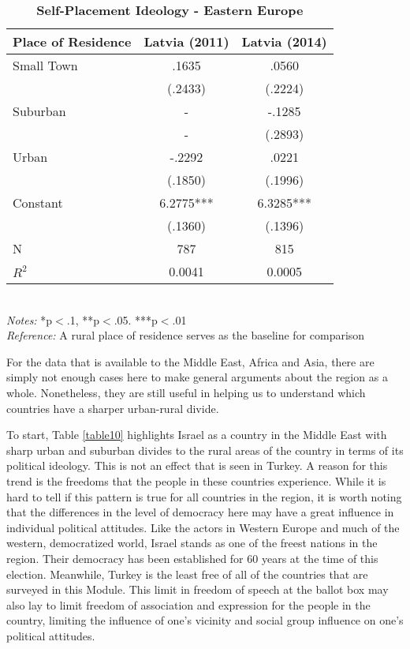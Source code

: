 \documentclass[12pt, titlepage]{article}
\newcommand\e{\emph}
\newcommand\tb{\textbf}
\begin{document}
\begin{singlespace}
	\begin{table}[H]
		\centering
		\caption{\tb{Self-Placement Ideology - Eastern Europe}}
		\begin{tabulary}{\linewidth}{l c c}
			\\
			\hline
			\tb{Place of Residence} & \tb{Latvia (2011)} &\tb{Latvia (2014)} \\
			\hline
			Small Town &.1635 &.0560 \\
			&(.2433) & (.2224) \\
			Suburban&- & -.1285 \\
			& - & (.2893) \\
			Urban&-.2292&.0221 \\
			& (.1850) & (.1996) \\
			Constant & 6.2775*** &6.3285*** \\
			& (.1360) & (.1396) \\
			N&787 & 815\\
			$R^2$& 0.0041 &0.0005 \\
			\hline
		\end{tabulary}
		\\
		\e{Notes:} *p$<$.1, **p$<$.05. ***p$<$.01 \\
		\e{Reference:} A rural place of residence serves as the baseline for comparison
		\label{table9}
	\end{table}
\end{singlespace}

For the data that is available to the Middle East, Africa and Asia, there are simply not enough cases here to make general arguments about the region as a whole. Nonetheless, they are still useful in helping us to understand which countries have a sharper urban-rural divide.

To start, Table \ref{table10} highlights Israel as a country in the Middle East with sharp urban and suburban divides to the rural areas of the country in terms of its political ideology. This is not an effect that is seen in Turkey. A reason for this trend is the freedoms that the people in these countries experience. While it is hard to tell if this pattern is true for all countries in the region, it is worth noting that the differences in the level of democracy here may have a great influence in individual political attitudes. Like the actors in Western Europe and much of the western, democratized world, Israel stands as one of the freest nations in the region. Their democracy has been established for 60 years at the time of this election. Meanwhile, Turkey is the least free of all of the countries that are surveyed in this Module. This limit in freedom of speech at the ballot box may also lay to limit freedom of association and expression for the people in the country, limiting the influence of one's vicinity and social group influence on one's political attitudes.
\end{document}
